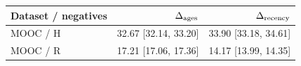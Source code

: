 \begin{tabular}{@{}lrr@{}}
\toprule
Dataset / negatives & $\Delta_{\rm ages}$ & $\Delta_{\rm recency}$\\
\midrule
MOOC / H & 32.67 [32.14, 33.20] & 33.90 [33.18, 34.61]\\
MOOC / R & 17.21 [17.06, 17.36] & 14.17 [13.99, 14.35]\\
\bottomrule
\end{tabular}
